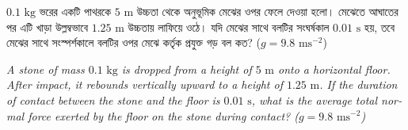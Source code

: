 \documentclass[12pt, a4paper]{article}
\begin{document}
\begin{tcolorbox}[questionbox={প্রশ্ন (Question) 44}]
\noindent
$0.1\text{ kg}$ ভরের একটি পাথরকে $5\text{ m}$ উচ্চতা থেকে অনুভূমিক মেঝের ওপর ফেলে দেওয়া হলো। মেঝেতে আঘাতের পর এটি খাড়া উল্লম্বভাবে $1.25\text{ m}$ উচ্চতায় লাফিয়ে ওঠে। যদি মেঝের সাথে বলটির সংঘর্ষকাল $0.01\text{ s}$ হয়, তবে মেঝের সাথে সংস্পর্শকালে বলটির ওপর মেঝে কর্তৃক প্রযুক্ত গড় বল কত? ($g = 9.8\text{ ms}^{-2}$)

\vspace{0.8em}
\begin{english}
\noindent\textit{\color{darkgray}
A stone of mass $0.1\text{ kg}$ is dropped from a height of $5\text{ m}$ onto a horizontal floor. After impact, it rebounds vertically upward to a height of $1.25\text{ m}$. If the duration of contact between the stone and the floor is $0.01\text{ s}$, what is the average total normal force exerted by the floor on the stone during contact? ($g = 9.8\text{ ms}^{-2}$)
}
\end{english}
\end{tcolorbox}
\end{document}
